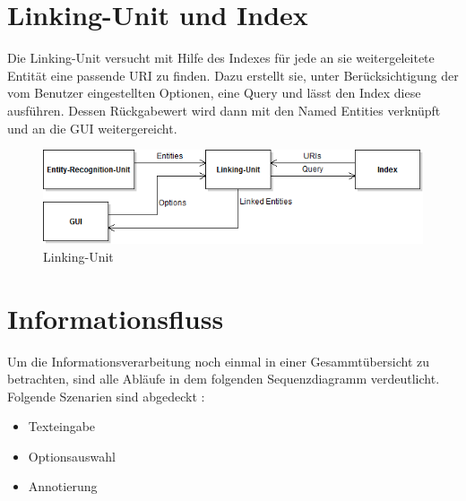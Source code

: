 \documentclass[11pt, a4paper, oneside]{Thesis} %
\begin{document}
\section{Linking-Unit und Index}
Die Linking-Unit versucht mit Hilfe des Indexes f\"ur jede an sie weitergeleitete Entit\"at eine passende URI zu finden. Dazu erstellt sie, unter Ber\"ucksichtigung der vom Benutzer eingestellten Optionen, eine Query und l\"asst den Index diese ausf\"uhren. Dessen R\"uckgabewert wird dann mit den Named Entities verkn\"upft und an die GUI weitergereicht.
\begin{figure}[ht!]
\centering
\includegraphics[scale=0.55]{./linking.png}
\caption[Linking Unit]{Linking-Unit}
\end{figure}
\section{Informationsfluss}
Um die Informationsverarbeitung noch einmal in einer Gesammt\"ubersicht zu betrachten, sind alle Abl\"aufe in dem folgenden Sequenzdiagramm verdeutlicht.
Folgende Szenarien sind abgedeckt :
\begin{itemize}
\item Texteingabe
\item Optionsauswahl
\item Annotierung
\end{itemize}
\end{document}
